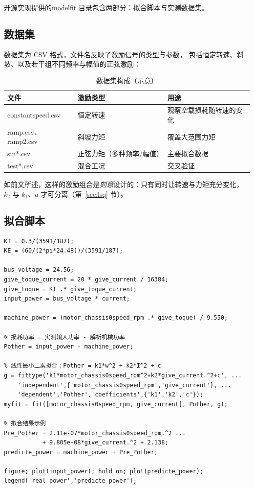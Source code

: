 \documentclass[cn,blue,11pt,device=normal]{elegantnote}
\newcommand{\code}[1]{{\ttfamily\small\def\_{\textunderscore\allowbreak}#1}}
\begin{document}

开源实现提供的\code{model\_fit} 目录包含两部分：拟合脚本与实测数据集。

\subsection{数据集}

数据集为 CSV 格式，文件名反映了激励信号的类型与参数，
包括恒定转速、斜坡、以及若干组不同频率与幅值的正弦激励：

\begin{table}[htbp]
  \centering
  \small
  \caption{数据集构成（示意）}
  \label{tab:datasets}
  \begin{tabular}{@{}lll@{}}
    \toprule
    文件 & 激励类型 & 用途 \\
    \midrule
    \code{constantspeed.csv} & 恒定转速 & 观察空载损耗随转速的变化 \\
    \code{ramp.csv}、\code{ramp2.csv} & 斜坡力矩 & 覆盖大范围力矩 \\
    \code{sin*.csv} & 正弦力矩（多种频率/幅值） & 主要拟合数据 \\
    \code{test*.csv} & 混合工况 & 交叉验证 \\
    \bottomrule
  \end{tabular}
\end{table}

如前文所述，这样的激励组合是\emph{刻意}设计的：只有同时让转速与力矩充分变化，
$k_2$ 与 $k_1$、$a$ 才可分离（第~\ref{sec:lsq} 节）。

\subsection{拟合脚本}

\begin{lstlisting}[style=matstyle]
KT = 0.3/(3591/187);
KE = (60/(2*pi*24.48))/(3591/187);

bus_voltage = 24.56;
give_toque_current = 20 * give_current / 16384;
give_toque = KT .* give_toque_current;
input_power = bus_voltage * current;

machine_power = (motor_chassis0speed_rpm .* give_toque) / 9.550;

% 损耗功率 = 实测输入功率 - 解析机械功率
Pother = input_power - machine_power;

% 线性最小二乘拟合：Pother = k1*w^2 + k2*I^2 + c
g = fittype('k1*motor_chassis0speed_rpm^2+k2*give_current.^2+c', ...
    'independent',{'motor_chassis0speed_rpm','give_current'}, ...
    'dependent','Pother','coefficients',{'k1','k2','c'});
myfit = fit([motor_chassis0speed_rpm, give_current], Pother, g);

% 拟合结果示例
Pre_Pother = 2.11e-07*motor_chassis0speed_rpm.^2 ...
           + 9.805e-08*give_current.^2 + 2.138;
predicte_power = machine_power + Pre_Pother;

figure; plot(input_power); hold on; plot(predicte_power);
legend('real power','predicte power');
\end{lstlisting}
\end{document}

